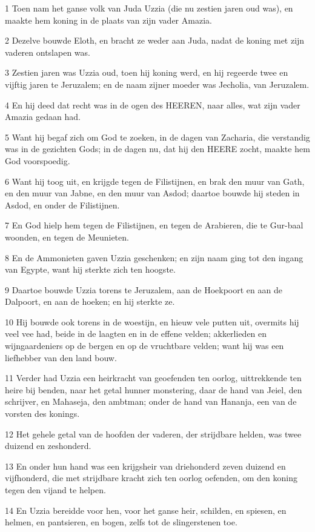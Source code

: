 \par 1 Toen nam het ganse volk van Juda Uzzia (die nu zestien jaren oud was), en maakte hem koning in de plaats van zijn vader Amazia.
\par 2 Dezelve bouwde Eloth, en bracht ze weder aan Juda, nadat de koning met zijn vaderen ontslapen was.
\par 3 Zestien jaren was Uzzia oud, toen hij koning werd, en hij regeerde twee en vijftig jaren te Jeruzalem; en de naam zijner moeder was Jecholia, van Jeruzalem.
\par 4 En hij deed dat recht was in de ogen des HEEREN, naar alles, wat zijn vader Amazia gedaan had.
\par 5 Want hij begaf zich om God te zoeken, in de dagen van Zacharia, die verstandig was in de gezichten Gods; in de dagen nu, dat hij den HEERE zocht, maakte hem God voorspoedig.
\par 6 Want hij toog uit, en krijgde tegen de Filistijnen, en brak den muur van Gath, en den muur van Jabne, en den muur van Asdod; daartoe bouwde hij steden in Asdod, en onder de Filistijnen.
\par 7 En God hielp hem tegen de Filistijnen, en tegen de Arabieren, die te Gur-baal woonden, en tegen de Meunieten.
\par 8 En de Ammonieten gaven Uzzia geschenken; en zijn naam ging tot den ingang van Egypte, want hij sterkte zich ten hoogste.
\par 9 Daartoe bouwde Uzzia torens te Jeruzalem, aan de Hoekpoort en aan de Dalpoort, en aan de hoeken; en hij sterkte ze.
\par 10 Hij bouwde ook torens in de woestijn, en hieuw vele putten uit, overmits hij veel vee had, beide in de laagten en in de effene velden; akkerlieden en wijngaardeniers op de bergen en op de vruchtbare velden; want hij was een liefhebber van den land bouw.
\par 11 Verder had Uzzia een heirkracht van geoefenden ten oorlog, uittrekkende ten heire bij benden, naar het getal hunner monstering, daar de hand van Jeiel, den schrijver, en Mahaseja, den ambtman; onder de hand van Hananja, een van de vorsten des konings.
\par 12 Het gehele getal van de hoofden der vaderen, der strijdbare helden, was twee duizend en zeshonderd.
\par 13 En onder hun hand was een krijgsheir van driehonderd zeven duizend en vijfhonderd, die met strijdbare kracht zich ten oorlog oefenden, om den koning tegen den vijand te helpen.
\par 14 En Uzzia bereidde voor hen, voor het ganse heir, schilden, en spiesen, en helmen, en pantsieren, en bogen, zelfs tot de slingerstenen toe.
